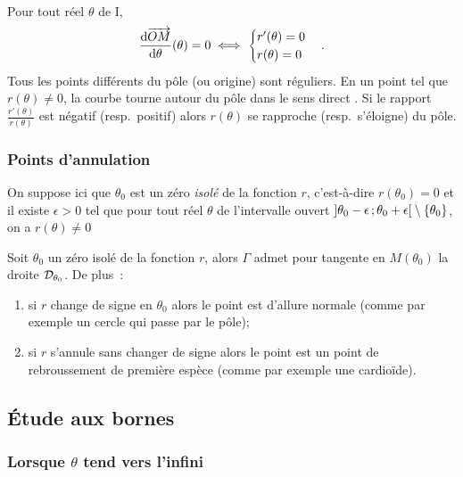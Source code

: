 Pour tout réel \(\theta\) de I,
\begin{equation}
  \dfrac{\mathrm{d} \overrightarrow{OM}}{\mathrm{d} \theta}(\theta)=0 \iff
  \begin{cases}
    r'(\theta) = 0 \\ r(\theta)=0
  \end{cases}.
\end{equation}
Tous les points différents du pôle (ou origine) sont réguliers. En un point tel 
que \(r(\theta) \neq 0\), la courbe \og tourne autour du pôle dans le sens 
direct \fg{}. Si le rapport \(\frac{r'(\theta)}{r(\theta)}\) est négatif (resp.\ 
positif) alors \(r(\theta)\) se rapproche (resp.\ s'éloigne) du pôle.

\subsubsection{Points d'annulation}

On suppose ici que \(\theta_0\) est un zéro \emph{isolé} de la fonction \(r\), 
c'est-à-dire \(r(\theta_0)=0\) et il existe \(\epsilon >0\) tel que pour tout 
réel \(\theta\) de l'intervalle ouvert 
\(\left] \theta_0-\epsilon \, ;  \theta_0 + \epsilon \right[\setminus\{\theta_0\}\), 
on a \(r(\theta) \neq 0\)

\begin{prop}[admise]
  Soit \(\theta_0\) un zéro isolé de la fonction \(r\), alors \(\Gamma\) admet 
  pour tangente en \(M(\theta_0)\) la droite \(\mathcal{D}_{\theta_0}\). De plus~:
  \begin{enumerate}
    \item si \(r\) change de signe en \(\theta_0\) alors le point est d'allure 
      normale (comme par exemple un cercle qui passe par le pôle);
    \item si \(r\) s'annule sans changer de signe alors le point est un point de 
      rebroussement de première espèce (comme par exemple une cardioïde).
  \end{enumerate}
\end{prop}

\subsection{Étude aux bornes}

\subsubsection{Lorsque \(\theta\) tend vers l'infini}

